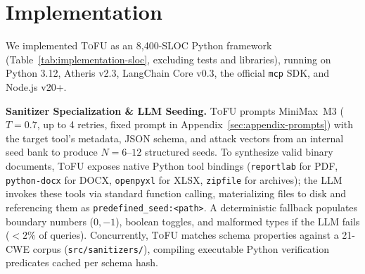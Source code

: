 \section{Implementation}
\label{sec:implementation}
We implemented \textsc{ToFU} as an 8,400-SLOC Python framework (Table~\ref{tab:implementation-sloc}, excluding tests and libraries), running on Python 3.12, Atheris v2.3, LangChain Core v0.3, the official \texttt{mcp} SDK, and Node.js v20+.

\begin{table}[t]
\centering
\caption{Codebase breakdown by major component.}
\label{tab:implementation-sloc}
\small
{}
\end{table}

\noindent\textbf{Sanitizer Specialization \& LLM Seeding.}
\textsc{ToFU} prompts \mbox{MiniMax M3} ($T=0.7$, up to 4 retries, fixed prompt in Appendix~\ref{sec:appendix-prompts}) with the target tool's metadata, JSON schema, and attack vectors from an internal seed bank to produce $N=6\text{--}12$ structured seeds. To synthesize valid binary documents, \textsc{ToFU} exposes native Python tool bindings (\texttt{reportlab} for PDF, \texttt{python-docx} for DOCX, \texttt{openpyxl} for XLSX, \texttt{zipfile} for archives); the LLM invokes these tools via standard function calling, materializing files to disk and referencing them as \texttt{predefined\_seed:<path>}. A deterministic fallback populates boundary numbers ($0, -1$), boolean toggles, and malformed types if the LLM fails ($<2\%$ of queries). Concurrently, \textsc{ToFU} matches schema properties against a 21-CWE corpus (\texttt{src/sanitizers/}), compiling executable Python verification predicates cached per schema hash.

